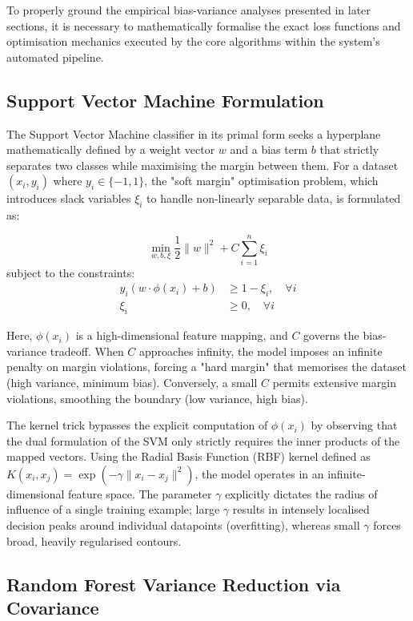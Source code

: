 \documentclass[conference]{IEEEtran}
\begin{document}
To properly ground the empirical bias-variance analyses presented in later sections, it is necessary to mathematically formalise the exact loss functions and optimisation mechanics executed by the core algorithms within the system's automated pipeline.

\subsection{Support Vector Machine Formulation}

The Support Vector Machine classifier in its primal form seeks a hyperplane mathematically defined by a weight vector $w$ and a bias term $b$ that strictly separates two classes while maximising the margin between them. For a dataset $(x_i, y_i)$ where $y_i \in \{-1, 1\}$, the "soft margin" optimisation problem, which introduces slack variables $\xi_i$ to handle non-linearly separable data, is formulated as:

\begin{equation}
\min_{w, b, \xi} \frac{1}{2} \|w\|^2 + C \sum_{i=1}^n \xi_i
\end{equation}
subject to the constraints:
\begin{align}
y_i (w \cdot \phi(x_i) + b) &\geq 1 - \xi_i, \quad \forall i \\
\xi_i &\geq 0, \quad \forall i
\end{align}

Here, $\phi(x_i)$ is a high-dimensional feature mapping, and $C$ governs the bias-variance tradeoff. When $C$ approaches infinity, the model imposes an infinite penalty on margin violations, forcing a "hard margin" that memorises the dataset (high variance, minimum bias). Conversely, a small $C$ permits extensive margin violations, smoothing the boundary (low variance, high bias). 

The kernel trick bypasses the explicit computation of $\phi(x_i)$ by observing that the dual formulation of the SVM only strictly requires the inner products of the mapped vectors. Using the Radial Basis Function (RBF) kernel defined as $K(x_i, x_j) = \exp(-\gamma \|x_i - x_j\|^2)$, the model operates in an infinite-dimensional feature space. The parameter $\gamma$ explicitly dictates the radius of influence of a single training example; large $\gamma$ results in intensely localised decision peaks around individual datapoints (overfitting), whereas small $\gamma$ forces broad, heavily regularised contours.

\subsection{Random Forest Variance Reduction via Covariance}
\end{document}
